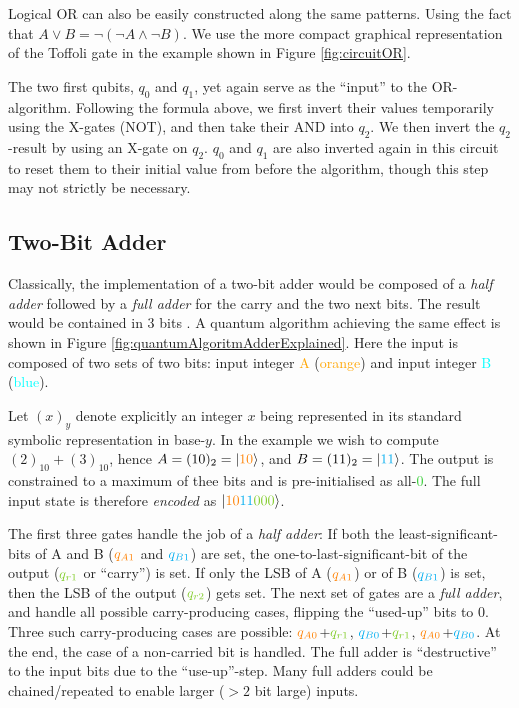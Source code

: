 \documentclass[conference]{IEEEtran}
\begin{document}
Logical OR can also be easily constructed along the same patterns.
Using the fact that $A \lor B = \lnot(\lnot A \land \lnot B)$.
We use the more compact graphical representation of the Toffoli gate in the example shown in Figure \ref{fig:circuitOR}.

The two first qubits, $q_0$ and $q_1$, yet again serve as the ``input'' to the OR-algorithm.
Following the formula above, we first invert their values temporarily using the X-gates (NOT), and then take their AND into $q_2$.
We then invert the $q_2$-result by using an X-gate on $q_2$. $q_0$ and $q_1$ are also inverted again in this circuit
to reset them to their initial value from before the algorithm, though this step may not strictly be necessary.
\subsection{Two-Bit Adder}
Classically, the implementation of a two-bit adder would be composed of a \textit{half adder} followed by a \textit{full adder} for the carry and the two next bits.
The result would be contained in 3 bits \cite{ref:wikipediaAdderElectronics}.
A quantum algorithm achieving the same effect is shown in Figure \ref{fig:quantumAlgoritmAdderExplained}.
Here the input is composed of two sets of two bits: input integer \textcolor{orange}{A} (\textcolor{orange}{orange}) and input integer \textcolor{cyan}{B} (\textcolor{cyan}{blue}).

Let $(x)_y$ denote explicitly an integer $x$ being represented in its standard symbolic representation in base-$y$.
In the example we wish to compute $(2)_{10} + (3)_{10}$, hence $A=(10)_{2}=\ket{\textcolor{orange}{10}}$, and $B=(11)_{2}=\ket{\textcolor{cyan}{11}}$.
The output is constrained to a maximum of thee bits and is pre-initialised as all-\textcolor{LimeGreen}{0}.
The full input state is therefore \textit{encoded} as $\ket{\textcolor{orange}{10}\textcolor{cyan}{11}\textcolor{LimeGreen}{000}}$.

The first three gates handle the job of a \textit{half adder}:
If both the least-significant-bits of A and B ($\textcolor{orange}{q_{A1}}$ and $\textcolor{cyan}{q_{B1}}$)
are set, the one-to-last-significant-bit of the output ($\textcolor{LimeGreen}{q_{r1}}$ or ``carry'') is set.
If only the LSB of A ($\textcolor{orange}{q_{A1}}$) or of B ($\textcolor{cyan}{q_{B1}}$) is set, then the LSB of the output ($\textcolor{LimeGreen}{q_{r2}}$) gets set.
The next set of gates are a \textit{full adder}, and handle all possible carry-producing cases, flipping the ``used-up'' bits to 0.
Three such carry-producing cases are possible: $\textcolor{orange}{q_{A0}}$+$\textcolor{LimeGreen}{q_{r1}}$, $\textcolor{cyan}{q_{B0}}$+$\textcolor{LimeGreen}{q_{r1}}$, $\textcolor{orange}{q_{A0}}$+$\textcolor{cyan}{q_{B0}}$.
At the end, the case of a non-carried bit is handled.
The full adder is ``destructive'' to the input bits due to the ``use-up''-step.
Many full adders could be chained/repeated to enable larger ($>2$ bit large) inputs.
\end{document}
